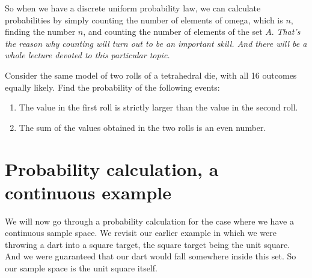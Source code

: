 \documentclass{tufte-handout}
\begin{document}
So when we have a discrete uniform probability law, we can calculate probabilities by simply counting
the number of elements of omega, which is $n$, finding the number $n$, and counting the number of
elements of the set $A$. \textit{That's the reason why counting will turn out to be an important skill. And there will
be a whole lecture devoted to this particular topic.}

Consider the same model of two rolls of a tetrahedral die, with all 16 outcomes equally likely. Find the probability of the following events:
\begin{enumerate}
\item The value in the first roll is strictly larger than the value in the second roll.
\item The sum of the values obtained in the two rolls is an even number.
\end{enumerate}





\subsection{}\label{sec:outcomes}






\vspace{0.5cm}



\section{Probability calculation, a continuous example}\label{sec:continuous-example}

We will now go through a probability calculation for the case where we have a continuous sample
space. We revisit our earlier example in which we were throwing a dart into a square target, the square
target being the unit square. And we were guaranteed that our dart would fall somewhere inside this
set. So our sample space is the unit square itself.
\end{document}
